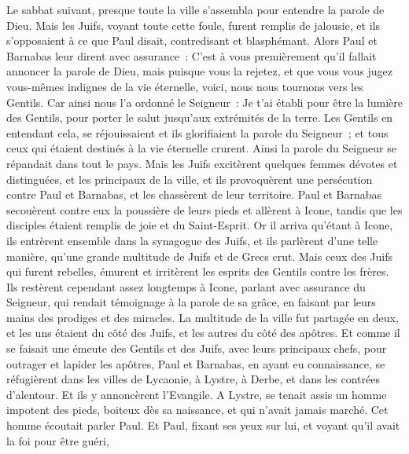 \begin{multicols}{2}
Le sabbat suivant, presque toute la ville s'assembla pour entendre la parole de Dieu.
Mais les Juifs, voyant toute cette foule, furent remplis de jalousie, et ils s'opposaient à ce que Paul disait, contredisant et blasphémant.
Alors Paul et Barnabas leur dirent avec assurance~: C'est à vous premièrement qu'il fallait annoncer la parole de Dieu, mais puisque vous la rejetez, et que vous vous jugez vous-mêmes indignes de la vie éternelle, voici, nous nous tournons vers les Gentils.
Car ainsi nous l'a ordonné le Seigneur~: Je t'ai établi pour être la lumière des Gentils, pour porter le salut jusqu'aux extrémités de la terre.
Les Gentils en entendant cela, se réjouissaient et ils glorifiaient la parole du Seigneur~; et tous ceux qui étaient destinés à la vie éternelle crurent.
Ainsi la parole du Seigneur se répandait dans tout le pays.
Mais les Juifs excitèrent quelques femmes dévotes et distinguées, et les principaux de la ville, et ils provoquèrent une persécution contre Paul et Barnabas, et les chassèrent de leur territoire.
Paul et Barnabas secouèrent contre eux la poussière de leurs pieds et allèrent à Icone,
tandis que les disciples étaient remplis de joie et du Saint-Esprit.
\VerseOne{}Or il arriva qu'étant à Icone, ils entrèrent ensemble dans la synagogue des Juifs, et ils parlèrent d'une telle manière, qu'une grande multitude de Juifs et de Grecs crut. 
Mais ceux des Juifs qui furent rebelles, émurent et irritèrent les esprits des Gentils contre les frères.
Ils restèrent cependant assez longtemps à Icone, parlant avec assurance du Seigneur, qui rendait témoignage à la parole de sa grâce, en faisant par leurs mains des prodiges et des miracles.
La multitude de la ville fut partagée en deux, et les uns étaient du côté des Juifs, et les autres du côté des apôtres.
Et comme il se faisait une émeute des Gentils et des Juifs, avec leurs principaux chefs, pour outrager et lapider les apôtres,
Paul et Barnabas, en ayant eu connaissance, se réfugièrent dans les villes de Lycaonie, à Lystre, à Derbe, et dans les contrées d'alentour.
Et ils y annoncèrent l'Evangile.
A Lystre, se tenait assis un homme impotent des pieds, boiteux dès sa naissance, et qui n'avait jamais marché.
Cet homme écoutait parler Paul. Et Paul, fixant ses yeux sur lui, et voyant qu'il avait la foi pour être guéri,

\end{multicols}
